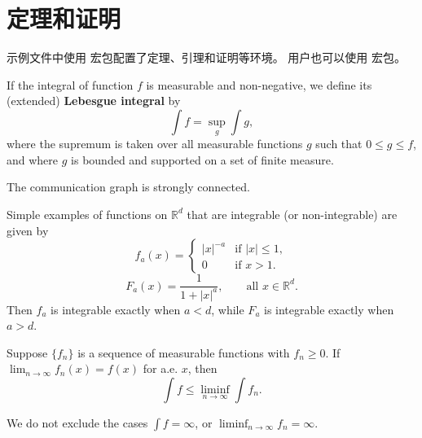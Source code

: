\section{定理和证明}

示例文件中使用  宏包配置了定理、引理和证明等环境。
用户也可以使用  宏包。

\begin{definition}
  If the integral of function $f$ is measurable and non-negative, we define
  its (extended) \textbf{Lebesgue integral} by
  \begin{equation}
    \int f = \sup_g \int g,
  \end{equation}
  where the supremum is taken over all measurable functions $g$ such that
  $0 \le g \le f$, and where $g$ is bounded and supported on a set of
  finite measure.
\end{definition}

\begin{assumption}
The communication graph is strongly connected.
\end{assumption}

\begin{example}
  Simple examples of functions on $\mathbb{R}^d$ that are integrable
  (or non-integrable) are given by
  \begin{equation}
    f_a(x) =
    \begin{cases}
      |x|^{-a} & \text{if } |x| \le 1, \\
      0        & \text{if } x > 1.
    \end{cases}
  \end{equation}
  \begin{equation}
    F_a(x) = \frac{1}{1 + |x|^a}, \qquad \text{all } x \in \mathbb{R}^d.
  \end{equation}
  Then $f_a$ is integrable exactly when $a < d$, while $F_a$ is integrable
  exactly when $a > d$.
\end{example}

\begin{lemma}[Fatou]
  Suppose $\{f_n\}$ is a sequence of measurable functions with $f_n \geq 0$.
  If $\lim_{n \to \infty} f_n(x) = f(x)$ for a.e. $x$, then
  \begin{equation}
    \int f \le \liminf_{n \to \infty} \int f_n.
  \end{equation}
\end{lemma}

\begin{remark}
  We do not exclude the cases $\int f = \infty$,
  or $\liminf_{n \to \infty} f_n = \infty$.
\end{remark}

